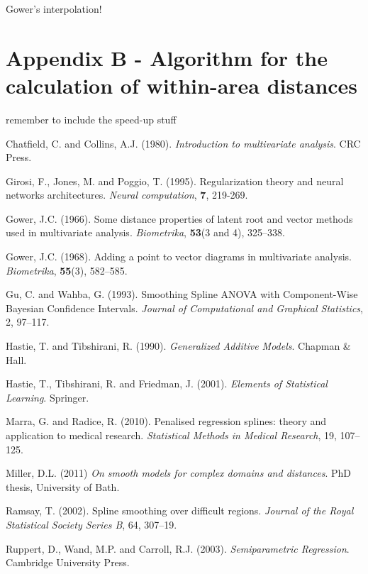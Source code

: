 \documentclass[useAMS,referee, usegraphicx]{biom}
\begin{document}
Gower's interpolation!


\section*{Appendix B - Algorithm for the calculation of within-area distances}

remember to include the speed-up stuff






\begin{thebibliography}{99}

\bibitem{} Chatfield, C. and Collins, A.J. (1980). \textit{Introduction to multivariate analysis}. CRC Press.

\bibitem{} Girosi, F., Jones, M. and Poggio, T. (1995). Regularization theory and neural networks architectures. \textit{Neural computation}, \textbf{7}, 219-269.

\bibitem{} Gower, J.C. (1966). Some distance properties of latent root and vector methods used in multivariate analysis. \textit{Biometrika}, \textbf{53}(3 and 4), 325--338.

\bibitem{} Gower, J.C. (1968). Adding a point to vector diagrams in multivariate analysis. \textit{Biometrika}, \textbf{55}(3), 582--585.

\bibitem{} Gu, C. and Wahba, G. (1993). Smoothing Spline ANOVA with Component-Wise Bayesian Confidence Intervals. \textit{Journal of Computational and Graphical Statistics}, 2, 97--117.

\bibitem{} Hastie, T. and Tibshirani, R. (1990). \textit{Generalized Additive Models}. Chapman \& Hall.

\bibitem{} Hastie, T., Tibshirani, R. and Friedman, J. (2001). \textit{Elements of Statistical Learning}. Springer.

\bibitem{} Marra, G. and Radice, R. (2010). Penalised regression splines: theory and application to medical research. \textit{Statistical Methods in Medical Research}, 19, 107--125.

\bibitem{} Miller, D.L. (2011) \textit{On smooth models for complex domains and distances}. PhD thesis, University of Bath.

\bibitem{} Ramsay, T. (2002). Spline smoothing over difficult regions. \textit{Journal of the Royal Statistical Society Series B}, 64, 307--19.

\bibitem{} Ruppert, D., Wand, M.P. and Carroll, R.J. (2003). \textit{Semiparametric Regression}. Cambridge University Press.


\end{thebibliography}
\end{document}
